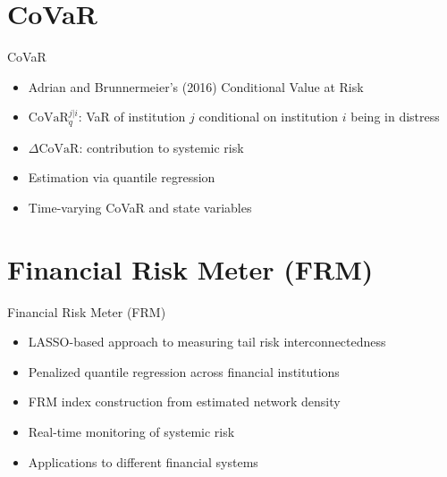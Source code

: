 \documentclass[9pt, aspectratio=169, t]{beamer}
\theoremstyle{definition}
\begin{document}
\section{CoVaR}

\begin{frame}{CoVaR}
    \begin{itemize}
        \item Adrian and Brunnermeier's (2016) Conditional Value at Risk
        \item $\text{CoVaR}_{q}^{j|i}$: VaR of institution $j$ conditional on institution $i$ being in distress
        \item $\Delta\text{CoVaR}$: contribution to systemic risk
        \item Estimation via quantile regression
        \item Time-varying CoVaR and state variables
    \end{itemize}
\end{frame}

\section{Financial Risk Meter (FRM)}

\begin{frame}{Financial Risk Meter (FRM)}
    \begin{itemize}
        \item LASSO-based approach to measuring tail risk interconnectedness
        \item Penalized quantile regression across financial institutions
        \item FRM index construction from estimated network density
        \item Real-time monitoring of systemic risk
        \item Applications to different financial systems
    \end{itemize}
\end{frame}

\end{document}
